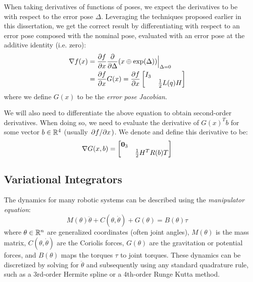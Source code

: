\documentclass[../root.tex]{subfiles}
\begin{document}
When taking derivatives of functions of poses, we expect the derivatives to be with respect 
to the error pose $\Delta$. Leveraging the techniques proposed earlier in this dissertation,
we get the correct result by differentiating with respect to an error pose composed with the
nominal pose, evaluated with an error pose at the additive identity (i.e. zero):
\begin{align}
    \nabla f(x) &= \pdv{f}{x} \pdv{\Delta}(x \oplus \text{exp}(\Delta)) \Big|_{\Delta = 0} \\
    &= \pdv{f}{x} G(x) = \pdv{f}{x} \begin{bmatrix}
        I_3 & \\ & \frac{1}{2} L(q) H
    \end{bmatrix}
\end{align}
where we define $G(x)$ to be the \textit{error pose Jacobian}.

We will also need to differentiate the above equation to obtain second-order derivatives. 
When doing so, we need to evaluate the derivative of $G(x)^T b$ for some vector $b \in \mathbb{R}^4$ 
(usually $\pdv*{f}{x})$. We denote and define this derivative to be:
\begin{equation}
    \nabla G(x,b) = \begin{bmatrix}
        \mathbf{0}_3 & \\ & \frac{1}{2} H^T R(b) T
    \end{bmatrix}
\end{equation}


\subsection{Variational Integrators}
The dynamics for many robotic systems can be described using the \textit{manipulator equation}:
\begin{equation}
    M(\theta) \ddot{\theta} + C(\theta,\dot{\theta}) + G(\theta) = B(\theta) \tau
\end{equation}
where $\theta \in \mathbb{R}^n$ are generalized coordinates (often joint angles), $M(\theta)$ is 
the mass matrix, 
$C(\theta, \dot{\theta})$ are the Coriolis forces, $G(\theta)$ are the gravitation or 
potential forces, and $B(\theta)$ maps the torques $\tau$ to joint torques. These dynamics
can be discretized by solving for $\ddot{\theta}$ and subsequently using any standard 
quadrature rule, such as a 3rd-order Hermite spline or a 4th-order Runge Kutta method. 
\end{document}
